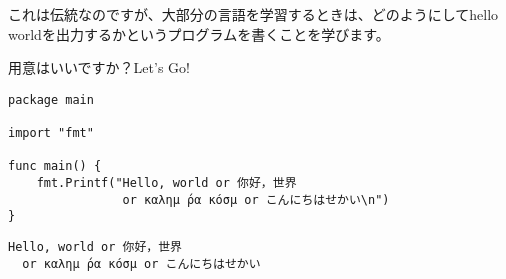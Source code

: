 これは伝統なのですが、大部分の言語を学習するときは、どのようにしてhello worldを出力するかというプログラムを書くことを学びます。

用意はいいですか？Let's Go!


\begin{lstlisting}[numbers=none]
package main

import "fmt"

func main() {
    fmt.Printf("Hello, world or 你好，世界
                or καλημ ́ρα κóσμ or こんにちはせかい\n")
}\end{lstlisting}



\begin{lstlisting}[numbers=none]
  Hello, world or 你好，世界
  or καλημ ́ρα κóσμ or こんにちはせかい
\end{lstlisting}
